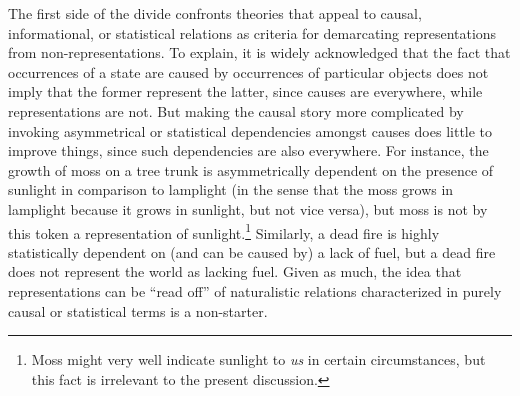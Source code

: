 The first side of the divide confronts theories that appeal to causal, informational, or statistical relations as criteria for demarcating representations from non-representations. To explain, it is widely acknowledged that the fact that occurrences of a state are caused by occurrences of particular objects does not imply that the former represent the latter, since causes are everywhere, while representations are not. But making the causal story more complicated by invoking asymmetrical \citep[][Ch. 4]{Fodor:1987} or statistical \citep{Eliasmith:2000} dependencies amongst causes does little to improve things, since such dependencies are also everywhere. For instance, the growth of moss on a tree trunk is asymmetrically dependent on the presence of sunlight in comparison to lamplight (in the sense that the moss grows in lamplight because it grows in sunlight, but not vice versa), but moss is not by this token a representation of sunlight.\footnote{Moss might very well indicate sunlight to \textit{us} in certain circumstances, but this fact is irrelevant to the present discussion.} Similarly, a dead fire is highly statistically dependent on (and can be caused by) a lack of fuel, but a dead fire does not represent the world as lacking fuel. Given as much, the idea that representations can be ``read off'' of naturalistic relations characterized in purely causal or statistical terms is a non-starter. 

